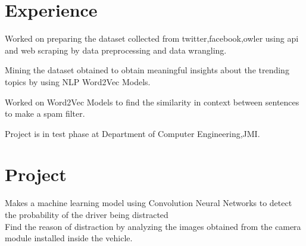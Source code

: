 \documentclass[]{deedy-resume-openfont}
\begin{document}
\hfill
\begin{minipage}[t]{0.66\textwidth}


\section{Experience}
\sectionsep

\vspace{\topsep}
\begin{tightemize}
\item Worked on preparing the dataset collected from twitter,facebook,owler using api  and web scraping by data preprocessing and data wrangling.
\item Mining the dataset obtained to obtain meaningful insights about the trending topics by using NLP Word2Vec Models.
\end{tightemize}
\sectionsep

\begin{tightemize}
\item Worked on  Word2Vec Models to find the similarity in context between sentences to make a spam filter.
\item Project is in test phase at Department of Computer Engineering,JMI.
\end{tightemize}
\sectionsep


\section{Project}
\textbullet{}Makes a machine learning model using Convolution Neural Networks to detect the probability of the driver being distracted\\
\textbullet{}Find the reason of distraction by analyzing the images obtained from the camera module installed inside the vehicle.
\sectionsep


\end{minipage}
\end{document}

